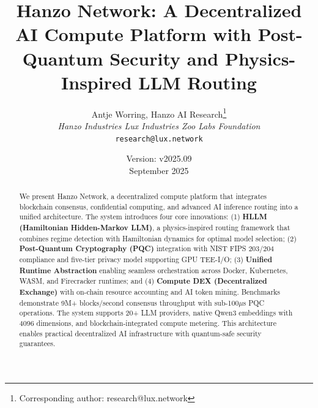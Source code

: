 \documentclass[11pt,twocolumn]{article}
\title{\textbf{Hanzo Network: A Decentralized AI Compute Platform with Post-Quantum Security and Physics-Inspired LLM Routing}}
\author{
Antje Worring, Hanzo AI Research\thanks{Corresponding author: research@lux.network} \\
\textit{Hanzo Industries \quad Lux Industries \quad Zoo Labs Foundation} \\
\texttt{research@lux.network}
}
\date{Version: v2025.09 \\ September 2025}
\begin{document}
\hanzocoverpage

\begin{abstract}
We present Hanzo Network, a decentralized compute platform that integrates blockchain consensus, confidential computing, and advanced AI inference routing into a unified architecture. The system introduces four core innovations: (1) \textbf{HLLM (Hamiltonian Hidden-Markov LLM)}, a physics-inspired routing framework that combines regime detection with Hamiltonian dynamics for optimal model selection; (2) \textbf{Post-Quantum Cryptography (PQC)} integration with NIST FIPS 203/204 compliance and five-tier privacy model supporting GPU TEE-I/O; (3) \textbf{Unified Runtime Abstraction} enabling seamless orchestration across Docker, Kubernetes, WASM, and Firecracker runtimes; and (4) \textbf{Compute DEX (Decentralized Exchange)} with on-chain resource accounting and AI token mining. Benchmarks demonstrate 9M+ blocks/second consensus throughput with sub-100$\mu$s PQC operations. The system supports 20+ LLM providers, native Qwen3 embeddings with 4096 dimensions, and blockchain-integrated compute metering. This architecture enables practical decentralized AI infrastructure with quantum-safe security guarantees.
\end{abstract}


















\end{document}
